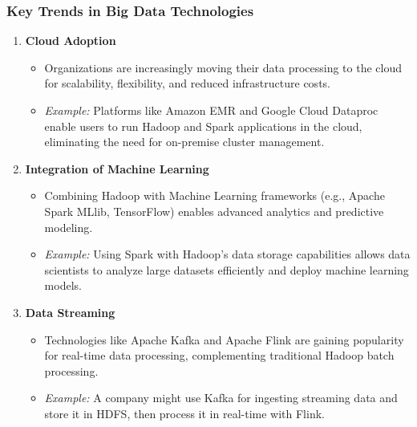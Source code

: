 \documentclass[aspectratio=169]{beamer}
\begin{document}
\begin{frame}[fragile]
    \frametitle{Key Trends in Big Data Technologies}
    \begin{enumerate}
        \item \textbf{Cloud Adoption}
        \begin{itemize}
            \item Organizations are increasingly moving their data processing to the cloud for scalability, flexibility, and reduced infrastructure costs.
            \item \textit{Example:} Platforms like Amazon EMR and Google Cloud Dataproc enable users to run Hadoop and Spark applications in the cloud, eliminating the need for on-premise cluster management.
        \end{itemize}
        
        \item \textbf{Integration of Machine Learning}
        \begin{itemize}
            \item Combining Hadoop with Machine Learning frameworks (e.g., Apache Spark MLlib, TensorFlow) enables advanced analytics and predictive modeling.
            \item \textit{Example:} Using Spark with Hadoop’s data storage capabilities allows data scientists to analyze large datasets efficiently and deploy machine learning models.
        \end{itemize}
        
        \item \textbf{Data Streaming}
        \begin{itemize}
            \item Technologies like Apache Kafka and Apache Flink are gaining popularity for real-time data processing, complementing traditional Hadoop batch processing.
            \item \textit{Example:} A company might use Kafka for ingesting streaming data and store it in HDFS, then process it in real-time with Flink.
        \end{itemize}
    \end{enumerate}
\end{frame}
\end{document}
